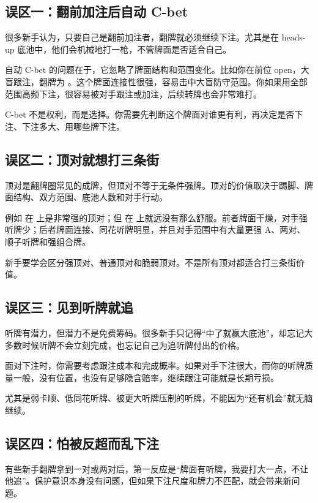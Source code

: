 \subsection{误区一：翻前加注后自动 C-bet}

很多新手认为，只要自己是翻前加注者，翻牌就必须继续下注。尤其是在 heads-up 底池中，他们会机械地打一枪，不管牌面是否适合自己。

自动 C-bet 的问题在于，它忽略了牌面结构和范围变化。比如你在前位 open，大盲跟注，翻牌为 。这个牌面连接性很强，容易击中大盲防守范围。你如果用全部范围高频下注，很容易被对手跟注或加注，后续转牌也会非常难打。

C-bet 不是权利，而是选择。你需要先判断这个牌面对谁更有利，再决定是否下注、下注多大、用哪些牌下注。

\subsection{误区二：顶对就想打三条街}

顶对是翻牌圈常见的成牌，但顶对不等于无条件强牌。顶对的价值取决于踢脚、牌面结构、双方范围、底池人数和对手行动。

例如  在  上是非常强的顶对；但  在  上就远没有那么舒服。前者牌面干燥，对手强听牌少；后者牌面连接、同花听牌明显，并且对手范围中有大量更强 A、两对、顺子听牌和强组合牌。

新手要学会区分强顶对、普通顶对和脆弱顶对。不是所有顶对都适合打三条街价值。

\subsection{误区三：见到听牌就追}

听牌有潜力，但潜力不是免费筹码。很多新手只记得“中了就赢大底池”，却忘记大多数时候听牌不会立刻完成，也忘记自己为追听牌付出的价格。

面对下注时，你需要考虑跟注成本和完成概率。如果对手下注很大，而你的听牌质量一般，没有位置，也没有足够隐含赔率，继续跟注可能就是长期亏损。

尤其是弱卡顺、低同花听牌、被更大听牌压制的听牌，不能因为“还有机会”就无脑继续。

\subsection{误区四：怕被反超而乱下注}

有些新手翻牌拿到一对或两对后，第一反应是“牌面有听牌，我要打大一点，不让他追”。保护意识本身没有问题，但如果下注尺度和牌力不匹配，就会带来新问题。

